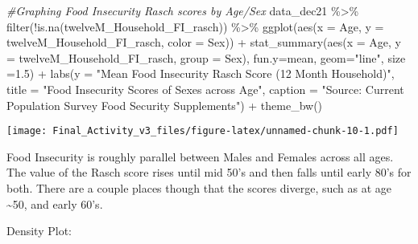 \documentclass[
]{article}
\newenvironment{Shaded}{\begin{snugshade}}{\end{snugshade}}
\newcommand{\AttributeTok}[1]{\textcolor[rgb]{0.77,0.63,0.00}{#1}}
\newcommand{\CommentTok}[1]{\textcolor[rgb]{0.56,0.35,0.01}{\textit{#1}}}
\newcommand{\FloatTok}[1]{\textcolor[rgb]{0.00,0.00,0.81}{#1}}
\newcommand{\FunctionTok}[1]{\textcolor[rgb]{0.00,0.00,0.00}{#1}}
\newcommand{\NormalTok}[1]{#1}
\newcommand{\SpecialCharTok}[1]{\textcolor[rgb]{0.00,0.00,0.00}{#1}}
\newcommand{\StringTok}[1]{\textcolor[rgb]{0.31,0.60,0.02}{#1}}
\begin{document}
\begin{Shaded}
\begin{Highlighting}[]
\CommentTok{\#Graphing Food Insecurity Rasch scores by Age/Sex}
\NormalTok{data\_dec21 }\SpecialCharTok{\%\textgreater{}\%} \FunctionTok{filter}\NormalTok{(}\SpecialCharTok{!}\FunctionTok{is.na}\NormalTok{(twelveM\_Household\_FI\_rasch)) }\SpecialCharTok{\%\textgreater{}\%} 
  \FunctionTok{ggplot}\NormalTok{(}\FunctionTok{aes}\NormalTok{(}\AttributeTok{x =}\NormalTok{ Age, }\AttributeTok{y =}\NormalTok{ twelveM\_Household\_FI\_rasch, }\AttributeTok{color =}\NormalTok{ Sex)) }\SpecialCharTok{+}
  \FunctionTok{stat\_summary}\NormalTok{(}\FunctionTok{aes}\NormalTok{(}\AttributeTok{x =}\NormalTok{ Age, }\AttributeTok{y =}\NormalTok{ twelveM\_Household\_FI\_rasch, }\AttributeTok{group =}\NormalTok{ Sex), }\AttributeTok{fun.y=}\NormalTok{mean, }\AttributeTok{geom=}\StringTok{"line"}\NormalTok{, }\AttributeTok{size =}\FloatTok{1.5}\NormalTok{) }\SpecialCharTok{+}
  \FunctionTok{labs}\NormalTok{(}\AttributeTok{y =} \StringTok{"Mean Food Insecurity Rasch Score (12 Month Household)"}\NormalTok{, }\AttributeTok{title =} \StringTok{"Food Insecurity Scores of Sexes across Age"}\NormalTok{, }\AttributeTok{caption =} \StringTok{"Source: Current Population Survey Food Security Supplements"}\NormalTok{) }\SpecialCharTok{+}
  \FunctionTok{theme\_bw}\NormalTok{() }
\end{Highlighting}
\end{Shaded}

\texttt{[image: Final\_Activity\_v3\_files/figure-latex/unnamed-chunk-10-1.pdf]}

Food Insecurity is roughly parallel between Males and Females across all
ages. The value of the Rasch score rises until mid 50's and then falls
until early 80's for both. There are a couple places though that the
scores diverge, such as at age \textasciitilde50, and early 60's.

Density Plot:
\end{document}
